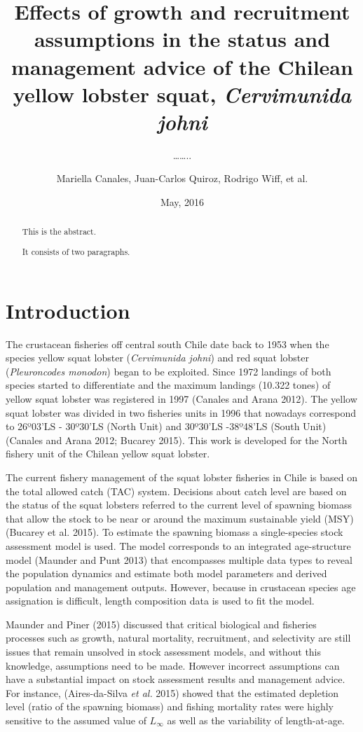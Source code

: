 \documentclass[11pt,letter,]{article}
\title{Effects of growth and recruitment assumptions in the status and
management advice of the Chilean yellow lobster squat, \emph{Cervimunida
johni}}
\subtitle{\ldots{}\ldots{}..}
\author{Mariella Canales, Juan-Carlos Quiroz, Rodrigo Wiff, et al.}
\date{May, 2016}
\begin{document}
\maketitle
\begin{abstract}
This is the abstract.

It consists of two paragraphs.
\end{abstract}

\section{Introduction}\label{introduction}

The crustacean fisheries off central south Chile date back to 1953 when
the species yellow squat lobster (\emph{Cervimunida johni}) and red
squat lobster (\emph{Pleuroncodes monodon}) began to be exploited. Since
1972 landings of both species started to differentiate and the maximum
landings (10.322 tones) of yellow squat lobster was registered in 1997
(Canales and Arana 2012). The yellow squat lobster was divided in two
fisheries units in 1996 that nowadays correspond to 26º03'LS - 30º30'LS
(North Unit) and 30º30'LS -38º48'LS (South Unit) (Canales and Arana
2012; Bucarey 2015). This work is developed for the North fishery unit
of the Chilean yellow squat lobster.

The current fishery management of the squat lobster fisheries in Chile
is based on the total allowed catch (TAC) system. Decisions about catch
level are based on the status of the squat lobsters referred to the
current level of spawning biomass that allow the stock to be near or
around the maximum sustainable yield (MSY) (Bucarey et al. 2015). To
estimate the spawning biomass a single-species stock assessment model is
used. The model corresponds to an integrated age-structure model
(Maunder and Punt 2013) that encompasses multiple data types to reveal
the population dynamics and estimate both model parameters and derived
population and management outputs. However, because in crustacean
species age assignation is difficult, length composition data is used to
fit the model.

Maunder and Piner (2015) discussed that critical biological and
fisheries processes such as growth, natural mortality, recruitment, and
selectivity are still issues that remain unsolved in stock assessment
models, and without this knowledge, assumptions need to be made. However
incorrect assumptions can have a substantial impact on stock assessment
results and management advice. For instance, (Aires-da-Silva \emph{et
al.} 2015) showed that the estimated depletion level (ratio of the
spawning biomass) and fishing mortality rates were highly sensitive to
the assumed value of \(L_{\infty}\) as well as the variability of
length-at-age.
\end{document}
